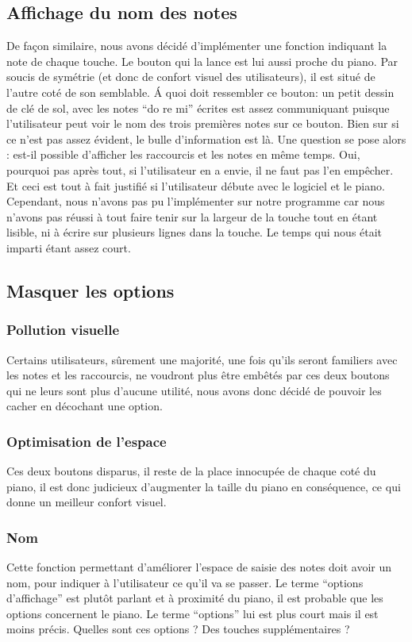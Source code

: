 \documentclass{article}
\begin{document}
\subsection{Affichage du nom des notes}
De façon similaire, nous avons décidé d'implémenter une fonction indiquant la note de chaque touche. Le bouton qui la lance est lui 
aussi proche du piano. Par soucis de symétrie (et donc de confort visuel des utilisateurs), il est situé de l'autre coté de son semblable.
\'A quoi doit ressembler ce bouton: un petit dessin de clé de sol, avec les notes ``do re mi'' écrites est assez communiquant puisque
l'utilisateur peut voir le nom des trois premières notes sur ce bouton. Bien sur si ce n'est pas assez évident, le bulle d'information
est là.
Une question se pose alors : est-il possible d'afficher les raccourcis et les notes en même temps.
Oui, pourquoi pas après tout, si l'utilisateur en a envie, il ne faut pas l'en empêcher. Et ceci est tout à fait justifié si 
l'utilisateur débute avec le logiciel et le piano.
Cependant, nous n'avons pas pu l'implémenter sur notre programme car nous n'avons pas réussi à tout faire tenir sur la largeur de la touche
tout en étant lisible, ni à écrire sur plusieurs lignes dans la touche. Le temps qui nous était imparti étant assez court.
\subsection{Masquer les options}
\subsubsection{Pollution visuelle}
Certains utilisateurs, sûrement une majorité, une fois qu'ils seront familiers avec les notes et les raccourcis, ne voudront plus 
être embêtés par ces deux boutons qui ne leurs sont plus d'aucune utilité, nous avons donc décidé de pouvoir les cacher en décochant
une option.
\subsubsection{Optimisation de l'espace}
Ces deux boutons disparus, il reste de la place innocupée de chaque coté du piano, il est donc judicieux d'augmenter la taille 
du piano en conséquence, ce qui donne un meilleur confort visuel.

\subsubsection{Nom}
Cette fonction permettant d'améliorer l'espace de saisie des notes doit avoir un nom, pour indiquer à l'utilisateur ce qu'il va se 
passer. Le terme ``options d'affichage'' est plutôt parlant et à proximité du piano, il est probable que les options concernent le 
piano.
Le terme ``options'' lui est plus court mais il est moins précis. Quelles sont ces options ? Des touches supplémentaires ?
\end{document}
